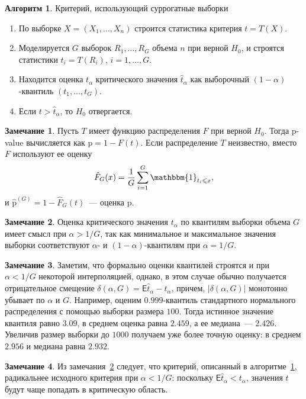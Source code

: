 \documentclass[specialist,
substylefile = spbu_report.rtx,
subf,href,colorlinks=true, 12pt]{disser}
\theoremstyle{definition}
\newtheorem{algorithm}{Алгоритм}
\newtheorem{remark}{Замечание}
\begin{document}
\begin{algorithm}{Критерий, использующий суррогатные выборки}\label{alg:surrogate}
	\begin{enumerate}
		\item По выборке $X=(X_1,\ldots, X_n)$ строится статистика критерия $t=T(X)$.
		\item Моделируется $G$ выборок $R_1,\ldots, R_G$ объема $n$ при верной $H_0$, и строятся статистики $t_i=T(R_i)$, $i=1,\ldots, G$.
		\item Находится оценка $t_\alpha$ критического значения $\hat t_\alpha$ как выборочный $(1-\alpha)$-квантиль $(t_1,\ldots,t_G)$.
		\item Если $t>\hat t_\alpha$, то $H_0$ отвергается.
	\end{enumerate}
\end{algorithm}

\begin{remark}
	Пусть $T$ имеет функцию распределения $F$ при верной $H_0$. Тогда p-value вычисляется как $\mathrm p= 1-F(t)$. Если распределение $T$ неизвестно, вместо $F$ используют ее оценку
	\[
		\hat F_G(x)=\frac{1}G\sum_{i=1}^G \mathbbm{1}_{t_i\leqslant x},
	\]
	и $\hat {\mathrm p}^{(G)} = 1 - \hat F_G(t)$~--- оценка $\mathrm p$.
\end{remark}

\begin{remark}\label{rem:assumption1}
	Оценка критического значения $t_\alpha$ по квантилям выборки объема $G$ имеет смысл при $\alpha>1/G$, так как минимальное и максимальное значения выборки соответствуют $\alpha$- и $(1-\alpha)$-квантилям при $\alpha = 1/G$.
\end{remark}

\begin{remark}
Заметим, что формально оценки квантилей строятся и при $\alpha < 1/G$ некоторой интерполяцией, однако, в этом случае обычно получается отрицательное смещение $\delta(\alpha,G)=\mathsf E\hat t_\alpha - t_\alpha$, причем, $|\delta(\alpha, G)|$ монотонно убывает по $\alpha$ и $G$.
	Например, оценим $0.999$-квантиль стандартного нормального распределения с помощью выборки размера $100$. Тогда истинное значение квантиля равно $3.09$, в среднем оценка равна $2.459$, а ее медиана~--- $2.426$. Увеличив размер выборки до $1000$ получаем уже более точную оценку: в среднем $2.956$ и медиана равна $2.932$.
\end{remark}

\begin{remark}\label{remark:liberal0}
	Из замечания~\ref{rem:assumption1} следует, что критерий, описанный в алгоритме~\ref{alg:surrogate}, радикальнее исходного критерия при $\alpha < 1/G$: поскольку $\mathsf E\hat t_\alpha < t_\alpha$, значения $t$ будут чаще попадать в критическую область.
\end{remark}
\end{document}
